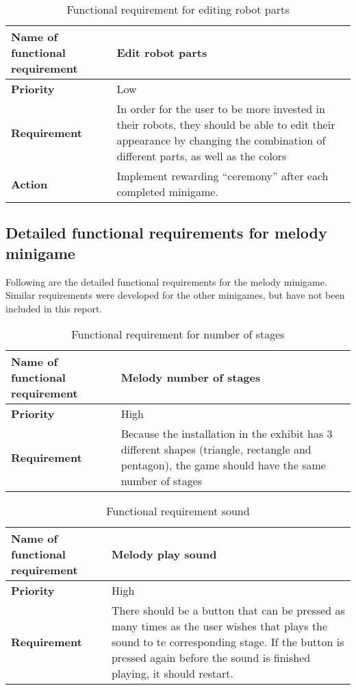 \begin{table}[!h]
\caption{Functional requirement for editing robot parts}
\begin{tabular}{ |p{7cm}|p{7cm}| }
\hline
\textbf {Name of functional requirement} & {Edit robot parts} \\ \hline
\textbf {Priority} & {Low} \\ \hline
\textbf {Requirement} & {In order for the user to be more invested in their robots, they should be able to edit their appearance by changing the combination of different parts, as well as the colors} \\ \hline
\textbf {Action} & {Implement rewarding “ceremony” after each completed minigame.} \\ \hline
\end{tabular}
\end{table}




\subsection{Detailed functional requirements for melody minigame}
Following are the detailed functional requirements for the melody minigame. Similar requirements were developed for the other minigames, but have not been included in this report.

\begin{table}[!h]
\caption{Functional requirement for number of stages}
\begin{tabular}{ |p{7cm}|p{7cm}| }
\hline
\textbf {Name of functional requirement} & {Melody number of stages} \\ \hline
\textbf {Priority} & {High} \\ \hline
\textbf {Requirement} & {Because the installation in the exhibit has 3 different shapes (triangle, rectangle and pentagon), the game should have the same number of stages} \\ \hline
\end{tabular}
\end{table}

\begin{table}[!h]
\caption{Functional requirement sound}
\begin{tabular}{ |p{7cm}|p{7cm}| }
\hline
\textbf {Name of functional requirement} & {Melody play sound} \\ \hline
\textbf {Priority} & {High} \\ \hline
\textbf {Requirement} & {There should be a button that can be pressed as many times as the user wishes that plays the sound to te corresponding stage. If the button is pressed again before the sound is finished playing, it should restart.} \\ \hline
\end{tabular}
\end{table}

